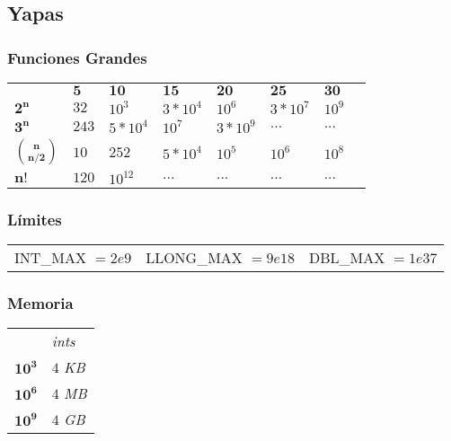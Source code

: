 \subsection{Yapas}

\subsubsection*{Funciones Grandes}

\begin{tabularx}{0.33\textwidth}{YYYYYYYY}
                      & $\mathbf{5}$ & $\mathbf{10}$ & $\mathbf{15}$ & $\mathbf{20}$ & $\mathbf{25}$ & $\mathbf{30}$ \\
     $\mathbf{2^n}$            & $32$  & $10^3$    & $3*10^4$ & $10^6$   & $3*10^7$ & $10^9$ \\
     $\mathbf{3^n}$            & $243$ & $5*10^4$  & $10^7$   & $3*10^9$ & $...$    & $...$ \\
     $\mathbf{\binom{n}{n/2}}$ & $10$  & $252$     & $5*10^4$ & $10^5$   & $10^6$   & $10^8$ \\
     $\mathbf{n!}$             & $120$ & $10^{12}$ & $...$    & $...$    & $...$    & $...$
\end{tabularx}

\subsubsection*{Límites}
\begin{tabular}{ccc}
    INT\_MAX $= 2e9$ & LLONG\_MAX $= 9e18$ & DBL\_MAX $= 1e37$
\end{tabular}

\subsubsection*{Memoria}
\begin{tabularx}{0.1\textwidth}{YY}
                          & \textit{ints} \\
     $\mathbf{10^{3}}$     & $4$ \textit{KB}  \\
     $\mathbf{10^{6}}$     & $4$ \textit{MB}  \\
     $\mathbf{10^{9}}$     & $4$ \textit{GB}  \\
\end{tabularx}

